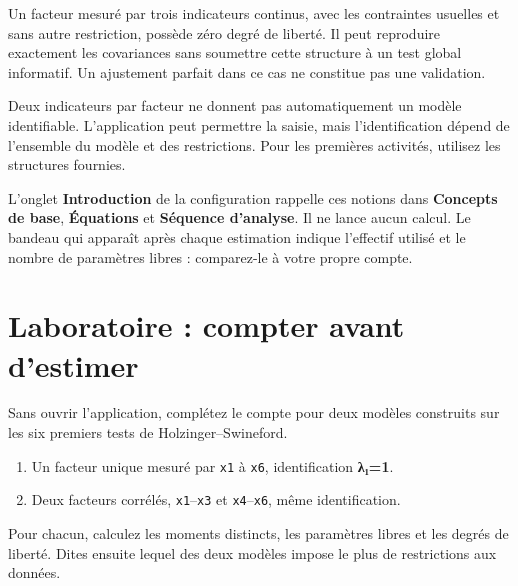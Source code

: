 \documentclass[
  french,
  11pt,
  a4paper,
  DIV=11,
  numbers=noendperiod]{scrreprt}
\providecommand{\tightlist}{%
  \setlength{\itemsep}{0pt}\setlength{\parskip}{0pt}}
\begin{document}
Un facteur mesuré par trois indicateurs continus, avec les contraintes
usuelles et sans autre restriction, possède zéro degré de liberté. Il
peut reproduire exactement les covariances sans soumettre cette
structure à un test global informatif. Un ajustement parfait dans ce cas
ne constitue pas une validation.

Deux indicateurs par facteur ne donnent pas automatiquement un modèle
identifiable. L'application peut permettre la saisie, mais
l'identification dépend de l'ensemble du modèle et des restrictions.
Pour les premières activités, utilisez les structures fournies.

\begin{tcolorbox}[enhanced jigsaw, arc=.35mm, bottomrule=.15mm, bottomtitle=1mm, breakable, colback=white, colbacktitle=quarto-callout-note-color!10!white, colframe=quarto-callout-note-color-frame, coltitle=black, left=2mm, leftrule=.75mm, opacityback=0, opacitybacktitle=0.6, rightrule=.15mm, title={Dans l'application}, titlerule=0mm, toprule=.15mm, toptitle=1mm]

L'onglet \textbf{Introduction} de la configuration rappelle ces notions
dans \textbf{Concepts de base}, \textbf{Équations} et \textbf{Séquence
d'analyse}. Il ne lance aucun calcul. Le bandeau qui apparaît après
chaque estimation indique l'effectif utilisé et le nombre de paramètres
libres : comparez-le à votre propre compte.

\end{tcolorbox}

\section{Laboratoire : compter avant
d'estimer}\label{laboratoire-compter-avant-destimer}

Sans ouvrir l'application, complétez le compte pour deux modèles
construits sur les six premiers tests de Holzinger--Swineford.

\begin{enumerate}
\def\labelenumi{\arabic{enumi}.}
\tightlist
\item
  Un facteur unique mesuré par \texttt{x1} à \texttt{x6}, identification
  \textbf{λ₁=1}.
\item
  Deux facteurs corrélés, \texttt{x1}--\texttt{x3} et
  \texttt{x4}--\texttt{x6}, même identification.
\end{enumerate}

Pour chacun, calculez les moments distincts, les paramètres libres et
les degrés de liberté. Dites ensuite lequel des deux modèles impose le
plus de restrictions aux données.
\end{document}
